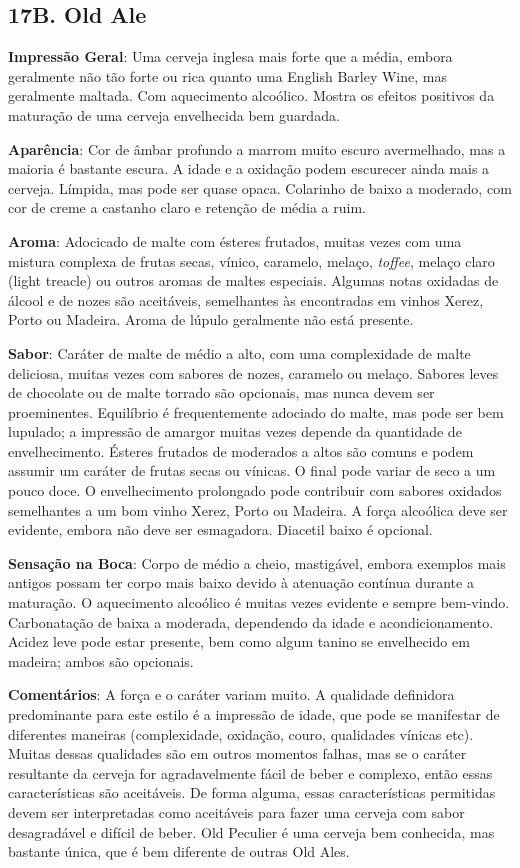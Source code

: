 \subsection*{17B. Old Ale}
\textbf{Impressão Geral}: Uma cerveja inglesa mais forte que a média, embora geralmente não tão forte ou rica quanto uma English Barley Wine, mas geralmente maltada. Com aquecimento alcoólico. Mostra os efeitos positivos da maturação de uma cerveja envelhecida bem guardada.

\textbf{Aparência}: Cor de âmbar profundo a marrom muito escuro avermelhado, mas a maioria é bastante escura. A idade e a oxidação podem escurecer ainda mais a cerveja. Límpida, mas pode ser quase opaca. Colarinho de baixo a moderado, com cor de creme a castanho claro e retenção de média a ruim.

\textbf{Aroma}: Adocicado de malte com ésteres frutados, muitas vezes com uma mistura complexa de frutas secas, vínico, caramelo, melaço, \textit{toffee}, melaço claro (light treacle) ou outros aromas de maltes especiais. Algumas notas oxidadas de álcool e de nozes são aceitáveis, semelhantes às encontradas em vinhos Xerez, Porto ou Madeira. Aroma de lúpulo geralmente não está presente.

\textbf{Sabor}: Caráter de malte de médio a alto, com uma complexidade de malte deliciosa, muitas vezes com sabores de nozes, caramelo ou melaço. Sabores leves de chocolate ou de malte torrado são opcionais, mas nunca devem ser proeminentes. Equilíbrio é frequentemente adociado do malte, mas pode ser bem lupulado; a impressão de amargor muitas vezes depende da quantidade de envelhecimento. Ésteres frutados de moderados a altos são comuns e podem assumir um caráter de frutas secas ou vínicas. O final pode variar de seco a um pouco doce. O envelhecimento prolongado pode contribuir com sabores oxidados semelhantes a um bom vinho Xerez, Porto ou Madeira. A força alcoólica deve ser evidente, embora não deve ser esmagadora. Diacetil baixo é opcional.

\textbf{Sensação na Boca}: Corpo de médio a cheio, mastigável, embora exemplos mais antigos possam ter corpo mais baixo devido à atenuação contínua durante a maturação. O aquecimento alcoólico é muitas vezes evidente e sempre bem-vindo. Carbonatação de baixa a moderada, dependendo da idade e acondicionamento. Acidez leve pode estar presente, bem como algum tanino se envelhecido em madeira; ambos são opcionais.

\textbf{Comentários}: A força e o caráter variam muito. A qualidade definidora predominante para este estilo é a impressão de idade, que pode se manifestar de diferentes maneiras (complexidade, oxidação, couro, qualidades vínicas etc). Muitas dessas qualidades são em outros momentos falhas, mas se o caráter resultante da cerveja for agradavelmente fácil de beber e complexo, então essas características são aceitáveis. De forma alguma, essas características permitidas devem ser interpretadas como aceitáveis para fazer uma cerveja com sabor desagradável e difícil de beber. Old Peculier é uma cerveja bem conhecida, mas bastante única, que é bem diferente de outras Old Ales.

